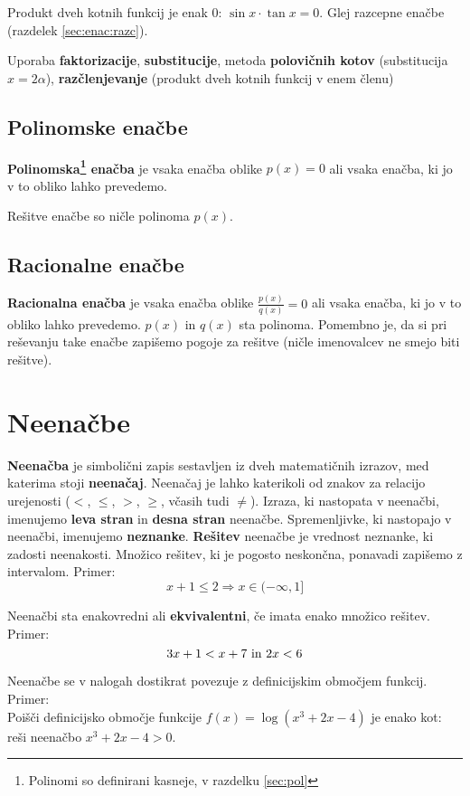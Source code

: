 \documentclass[a4paper,oneside,12pt,fleqn]{article}
\makeatletter
\newcommand\krat\cdot
\newcommand{\hyperanchor}[1]{\Hy@raisedlink{\hypertarget{#1}{}}}
\renewcommand\implies\Rightarrow
\numberwithin{equation}{section}
\makeatother
\begin{document}
Produkt dveh kotnih funkcij je enak 0: $\sin x \krat \tan x = 0$. Glej razcepne enačbe
(razdelek \ref{sec:enac:razc}).

Uporaba \textbf{faktorizacije}, \textbf{substitucije}, metoda \textbf{polovičnih kotov} (substitucija $x = 2\alpha$),
\textbf{razčlenjevanje} (produkt dveh kotnih funkcij v enem členu)

\subsection{Polinomske enačbe}
\label{sec:enac:pol}
\textbf{Polinomska\footnote{Polinomi so definirani kasneje, v razdelku \ref{sec:pol}}
enačba} je vsaka enačba oblike $p(x) = 0$ ali vsaka enačba, ki jo v to obliko lahko prevedemo. 

Rešitve enačbe so ničle polinoma $p(x)$.

\subsection{Racionalne enačbe}
\label{sec:enac:rac}
\textbf{Racionalna enačba} je vsaka enačba oblike $\frac{p(x)}{q(x)} = 0$ ali vsaka enačba, ki jo
v to obliko lahko prevedemo. $p(x)$ in $q(x)$ sta polinoma.
Pomembno je, da si pri reševanju take enačbe zapišemo pogoje
za rešitve (ničle imenovalcev ne smejo biti rešitve).

\section{Neenačbe}
\label{sec:neenac}
\textbf{Neenačba} je simbolični zapis sestavljen iz dveh matematičnih
izrazov, med katerima stoji \textbf{neenačaj}. \hyperanchor{point:neenacaj}
Neenačaj je lahko katerikoli od znakov za relacijo
urejenosti ($<$, $\leq$, $>$, $\geq$, včasih tudi $\neq$). Izraza, ki nastopata v neenačbi,
imenujemo \textbf{leva stran} in \textbf{desna stran} neenačbe.
Spremenljivke, ki nastopajo v neenačbi, imenujemo \textbf{neznanke}.
\textbf{Rešitev} neenačbe je vrednost neznanke, ki zadosti neenakosti. 
Množico rešitev, ki je pogosto neskončna, ponavadi zapišemo z intervalom.
Primer:
\[ x + 1 \leq 2 \implies x \in (-\infty, 1] \]

Neenačbi sta enakovredni ali \textbf{ekvivalentni}, če imata enako množico rešitev.
Primer:
\[ 3x + 1 < x + 7 \textnormal{ in } 2x < 6 \]

Neenačbe se v nalogah dostikrat povezuje z definicijskim območjem funkcij. Primer:\\
Poišči definicijsko območje funkcije $f(x) = \log(x^3 + 2x - 4)$ je enako kot: reši
neenačbo $x^3 + 2x - 4 >0$.
\end{document}
